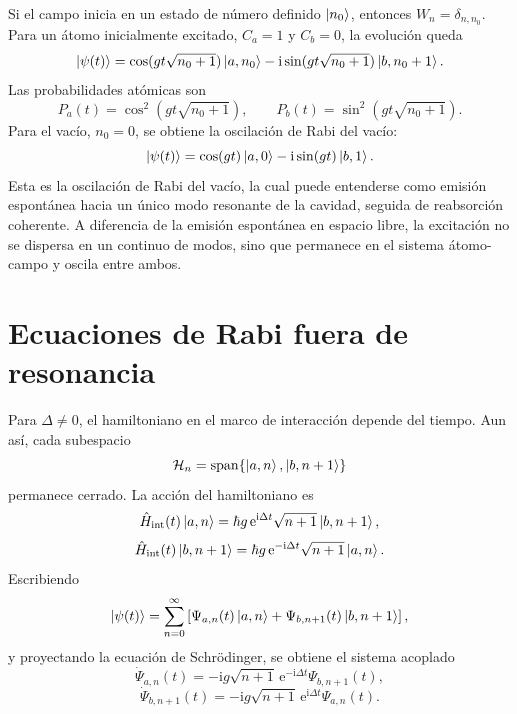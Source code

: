 \documentclass[11pt]{article}
\newcommand{\ii}{\mathrm{i}}
\newcommand{\ee}{\mathrm{e}}
\newcommand{\Hint}{\hat H_{\mathrm{int}}}
\begin{document}
Si el campo inicia en un estado de n\'umero definido $\ket{n_0}$, entonces
$W_n=\delta_{n,n_0}$. Para un \'atomo inicialmente excitado, $C_a=1$ y
$C_b=0$, la evoluci\'on queda
\begin{equation}
  \ket{\psi(t)}
  =
  \cos(gt\sqrt{n_0+1})\ket{a,n_0}
  -
  \ii\sin(gt\sqrt{n_0+1})\ket{b,n_0+1}.
\end{equation}
Las probabilidades at\'omicas son
\begin{equation}
  P_a(t)=\cos^2(gt\sqrt{n_0+1}),
  \qquad
  P_b(t)=\sin^2(gt\sqrt{n_0+1}).
\end{equation}
Para el vac\'io, $n_0=0$, se obtiene la oscilaci\'on de Rabi del vac\'io:
\begin{equation}
  \ket{\psi(t)}
  =
  \cos(gt)\ket{a,0}
  -
  \ii\sin(gt)\ket{b,1}.
\end{equation}
Esta es la oscilaci\'on de Rabi del vac\'io, la cual puede entenderse como
emisi\'on espont\'anea hacia un \'unico modo resonante de la cavidad, seguida de
reabsorci\'on coherente. A diferencia de la emisi\'on espont\'anea en espacio
libre, la excitaci\'on no se dispersa en un continuo de modos, sino que
permanece en el sistema \'atomo-campo y oscila entre ambos.

\section{Ecuaciones de Rabi fuera de resonancia}

Para $\Delta\neq0$, el hamiltoniano en el marco de interacci\'on depende del
tiempo. Aun as\'i, cada subespacio
\begin{equation}
  \mathcal H_n=\mathrm{span}\{\ket{a,n},\ket{b,n+1}\}
\end{equation}
permanece cerrado. La acci\'on del hamiltoniano es
\begin{equation}
  \Hint(t)\ket{a,n}
  =
  \hbar g\,\ee^{\ii\Delta t}\sqrt{n+1}\ket{b,n+1},
\end{equation}
\begin{equation}
  \Hint(t)\ket{b,n+1}
  =
  \hbar g\,\ee^{-\ii\Delta t}\sqrt{n+1}\ket{a,n}.
\end{equation}
Escribiendo
\begin{equation}
  \ket{\psi(t)}
  =
  \sum_{n=0}^{\infty}
  \left[
  \Psi_{a,n}(t)\ket{a,n}
  +
  \Psi_{b,n+1}(t)\ket{b,n+1}
  \right],
\end{equation}
y proyectando la ecuaci\'on de Schr\"odinger, se obtiene el sistema acoplado
\begin{equation}
  \dot\Psi_{a,n}(t)
  =
  -\ii g\sqrt{n+1}\,\ee^{-\ii\Delta t}\Psi_{b,n+1}(t),
\end{equation}
\begin{equation}
  \dot\Psi_{b,n+1}(t)
  =
  -\ii g\sqrt{n+1}\,\ee^{\ii\Delta t}\Psi_{a,n}(t).
\end{equation}
\end{document}
